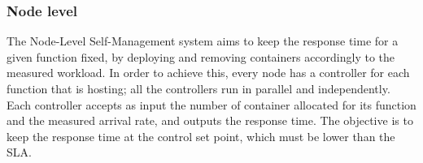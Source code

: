 \subsubsection*{Node level}
The Node-Level Self-Management system aims to keep the response time for a given function fixed, 
by deploying and removing containers accordingly to the measured workload.
In order to achieve this, every node has a controller for each function that is hosting; all the controllers
run in parallel and independently.
Each controller accepts as input the number of container allocated for its function and the 
measured arrival rate, and outputs the response time. The objective is to keep the response time
at the control set point, which must be lower than the SLA.
